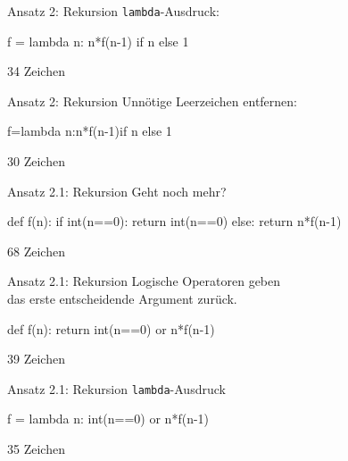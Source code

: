 \documentclass[xcolor=dvipsnames, aspectratio=43, 14pt]{beamer}
\begin{document}
\begin{frame}[fragile]{Ansatz 2: Rekursion}
	\texttt{lambda}-Ausdruck:
	
	\vfill
	
	\begin{python3code}
	f = lambda n: n*f(n-1) if n else 1
	\end{python3code}
	\vfill
	
	34 Zeichen
\end{frame}

\begin{frame}[fragile]{Ansatz 2: Rekursion}
	Unnötige Leerzeichen entfernen:
	
	\vfill
	
	\begin{python3code}
	f=lambda n:n*f(n-1)if n else 1
	\end{python3code}
	\vfill
	
	30 Zeichen
\end{frame}

\begin{frame}[fragile]{Ansatz 2.1: Rekursion}
	Geht noch mehr?
	
	\vfill
	
	\begin{python3code}
	def f(n):
	   if int(n==0):
	      return int(n==0)
	   else:
	      return n*f(n-1)
	\end{python3code}
	
	\vfill
	
	68 Zeichen
\end{frame}

\begin{frame}[fragile]{Ansatz 2.1: Rekursion}
	Logische Operatoren geben\\ das erste entscheidende Argument zurück.
	
	\vfill
	
	\begin{python3code}
	def f(n):
	   return int(n==0) or n*f(n-1)
	\end{python3code}
	
	\vfill
	
	39 Zeichen
\end{frame}

\begin{frame}[fragile]{Ansatz 2.1: Rekursion}
	\texttt{lambda}-Ausdruck
	
	\vfill
	
	\begin{python3code}
	f = lambda n: int(n==0) or n*f(n-1)
	\end{python3code}
	
	\vfill
	
	35 Zeichen
\end{frame}
\end{document}
